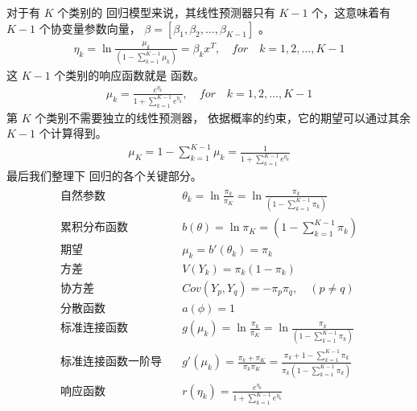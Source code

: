 \documentclass[letterpaper,10pt,english]{sphinxmanual}
\begin{document}
对于有 \(K\) 个类别的  回归模型来说，其线性预测器只有 \(K-1\)
个，这意味着有 \(K-1\) 个协变量参数向量， \(\beta=[\beta_1,\beta_2,\dots,\beta_{K-1}]\)
。
\begin{equation}\label{equation:无序离散模型/content:无序离散模型/content:16}
\begin{split}\eta_k = \ln \frac{  \mu_k}{  ( 1 - \sum_{k=1}^{K-1} \mu_k) } = \beta_k x^T
, \quad for \quad k=1,2,\dots,K-1\end{split}
\end{equation}
这 \(K-1\) 个类别的响应函数就是  函数。
\begin{equation}\label{equation:无序离散模型/content:eq_mg_037}
\begin{split}\mu_k =  \frac{e^{\eta_k}}{ 1+ \sum_{k=1}^{K-1}  e^{\eta_k}}
, \quad for \quad k=1,2,\dots,K-1\end{split}
\end{equation}
第 \(K\) 个类别不需要独立的线性预测器，
依据概率的约束，它的期望可以通过其余 \(K-1\) 个计算得到。
\begin{equation}\label{equation:无序离散模型/content:无序离散模型/content:17}
\begin{split}\mu_K = 1- \sum_{k=1}^{K-1} \mu_k = \frac{1}{ 1+ \sum_{k=1}^{K-1}  e^{\eta_k}}\end{split}
\end{equation}
最后我们整理下  回归的各个关键部分。
\begin{align}\label{equation:无序离散模型/content:无序离散模型/content:18}\!\begin{aligned}
\text{自然参数} & \quad \theta_k = \ln \frac{ \pi_k}{ \pi_K} = \ln \frac{  \pi_k}{  ( 1 - \sum_{k=1}^{K-1} \pi_k) }\\
\text{累积分布函数} & \quad b(\theta) =  \ln \pi_K = ( 1 - \sum_{k=1}^{K-1} \pi_k)\\
\text{期望} & \quad \mu_k = b'(\theta_k) = \pi_k\\
\text{方差}  & \quad V(Y_k) =  \pi_k(1-\pi_k)\\
\text{协方差}  & \quad Cov(Y_p,Y_q) = -  \pi_p \pi_q, \quad (p \ne q)\\
\text{分散函数} & \quad a(\phi) = 1\\
\text{标准连接函数} & \quad g(\mu_k) = \ln \frac{  \pi_k}{  \pi_K } = \ln \frac{  \pi_k}{  ( 1 - \sum_{k=1}^{K-1} \pi_k) }\\
\text{标准连接函数一阶导}  & \quad g'(\mu_k) = \frac{\pi_k + \pi_K}{\pi_k \pi_K} =\frac{\pi_k+1-\sum_{k=1}^{K-1} \pi_k}{\pi_k( 1 - \sum_{k=1}^{K-1} \pi_k)}\\
\text{响应函数}  & \quad r(\eta_k) =  \frac{e^{\eta_k}}{ 1+ \sum_{k=1}^{K-1}  e^{\eta_k}}\\
\end{aligned}\end{align}
\end{document}
